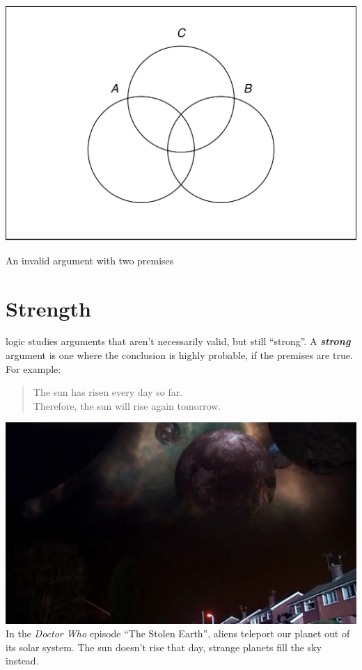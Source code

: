 \documentclass[justified]{tufte-book}
\newenvironment{argument}{\begin{quote}\normalsize}{\end{quote}}
\theoremstyle{definition}
\theoremstyle{definition}
\theoremstyle{definition}
\theoremstyle{remark}
\begin{document}
\begin{marginfigure}
\includegraphics{_main_files/figure-latex/invalidtwopremises-1} \caption[An invalid argument with two premises]{An invalid argument with two premises}\label{fig:invalidtwopremises}
\end{marginfigure}

\hypertarget{strength}{%
\section{Strength}\label{strength}}

 logic studies arguments that aren't necessarily
valid, but still ``strong''. A \textbf{\emph{strong}} argument is one
where the conclusion is highly probable, if the premises are true. For
example:

\begin{argument}
The sun has risen every day so far.\\
Therefore, the sun will rise again tomorrow.
\end{argument}

\begin{marginfigure}
\includegraphics{img/stolen_earth.png} In the \emph{Doctor Who} episode
``The Stolen Earth'', aliens teleport our planet out of its solar
system. The sun doesn't rise that day, strange planets fill the sky
instead.
\end{marginfigure}
\end{document}
